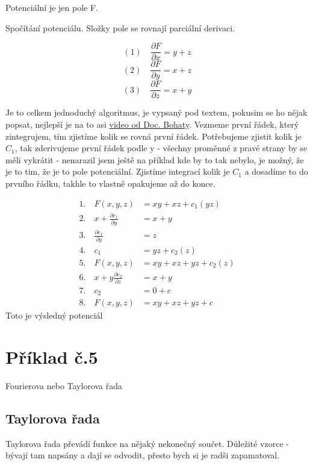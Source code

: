 \documentclass[12pt, letterpaper]{article}
\begin{document}
Potenciální je jen pole F.

Spočítání potenciálu. Složky pole se rovnají parciální derivaci.

\[(1) \quad \frac{\partial F}{\partial x} = y + z \]
\[(2) \quad  \frac{\partial F}{\partial y} = x + z \]
\[(3) \quad  \frac{\partial F}{\partial z} = x + y \]


\hypersetup{
    colorlinks=true,
    linkcolor=blue,
    filecolor=red,      
    urlcolor=cyan,
    }

Je to celkem jednoduchý algoritmus, je vypsaný pod textem, pokusim se ho nějak popsat, nejlepší je na to asi \href{https://www.youtube.com/watch?v=vSN8DivqVpQ&list=PLQL6z4JeTTQne5N_yD6X-hK3FW57rAb5b&index=19}{video od Doc. Bohaty}. Vezmeme první řádek, který zintegrujem, tím zjistíme kolik se rovná první řádek.
Potřebujeme zjistit kolik je $C_1$, tak zderivujeme první řádek podle y - všechny proměnné z pravé strany by se měli vykrátit - nenarazil jsem ještě na příklad kde by to tak nebylo, je možný, že je to tim, že je to pole potenciální.
Zjistíme integrací kolik je $C_1$ a dosadíme to do prvního řádku, takhle to vlastně opakujeme až do konce.

$$
\begin{aligned}
1. \quad F(x, y, z) &= xy + xz + c_1(yz) \\
2. \quad x + \frac{\partial c_1}{\partial y} &= x + y\\
3. \quad \frac{\partial c_1}{\partial y} &= z\\
4. \quad c_1 &= yz + c_2(z)\\
5. \quad F(x, y, z) &= xy + xz +  yz + c_2(z) \\
6. \quad x + y \frac{\partial c_2}{\partial z} &= x + y\\
7. \quad c_2 &= 0 + c\\
8. \quad F(x, y, z) &= xy + xz +  yz + c
\end{aligned}
$$
Toto je výsledný potenciál









\section*{Příklad č.5}

Fourierova nebo Taylorova řada

\subsection*{Taylorova řada}
Taylorova řada převádí funkce na nějaký nekonečný součet.
Důležité vzorce - bývají tam napsány a dají se odvodit, přesto bych si je radši zapamatoval.
\end{document}
